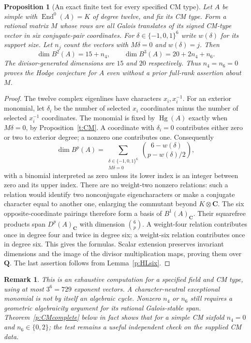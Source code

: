 \documentclass[10pt,reqno]{article}
\theoremstyle{emphasizedplain}
\newtheorem{proposition}[theorem]{Proposition}
\theoremstyle{emphasizeddefinition}
\theoremstyle{emphasizeddefinition}
\newtheorem{remark}[theorem]{Remark}
\DeclareMathOperator{\End}{End}
\DeclareMathOperator{\Hg}{Hg}
\newcommand{\Q}{\mathbf Q}
\newcommand{\C}{\mathbf C}
\begin{document}
\begin{proposition}[An exact finite test for every specified CM type]
\label{p:CMtest}
Let $A$ be simple with $\End^0(A)=K$ of degree twelve, and fix its CM
type. Form a rational matrix $M$ whose rows are all Galois translates
of its signed CM-type vector in six conjugate-pair coordinates. For
$\delta\in\{-1,0,1\}^6$ write $w(\delta)$ for its support size.
Let $n_j$ count the vectors with $M\delta=0$ and $w(\delta)=j$.
Then
\[
 \dim B^2(A)=15+n_4,\qquad
 \dim B^3(A)=20+2n_4+n_6.
\]
The divisor-generated dimensions are $15$ and $20$ respectively.
Thus $n_4=n_6=0$ proves the Hodge conjecture for $A$ even without a
prior full-rank assertion about $M$.
\end{proposition}
\begin{proof}
The twelve complex eigenlines have characters $x_i,x_i^{-1}$.
For an exterior monomial, let $\delta_i$ be the number of selected
$x_i$ coordinates minus the number of selected $x_i^{-1}$ coordinates.
The monomial is fixed by $\Hg(A)$ exactly when $M\delta=0$, by
Proposition~\ref{t:CM}. A coordinate with $\delta_i=0$ contributes
either zero or two to exterior degree; a nonzero one contributes one.
Consequently
\[
 \dim B^p(A)=\sum_{\substack{\delta\in\{-1,0,1\}^6\\M\delta=0}}
 \binom{6-w(\delta)}{p-w(\delta)/2},
\]
with a binomial interpreted as zero unless its lower index is an integer
between zero and its upper index.
There are no weight-two nonzero relations: such a relation would identify
two nonconjugate eigencharacters or make a conjugate character equal to
another one, enlarging the commutant beyond $K\otimes\C$.
The six opposite-coordinate pairings therefore form a basis of
$B^1(A)_\C$. Their squarefree products span $D^p(A)_\C$ with dimension
$\binom6p$. A weight-four relation contributes once in degree four and
twice in degree six; a weight-six relation contributes once in degree six.
This gives the formulas. Scalar extension preserves invariant dimensions
and the image of the divisor multiplication maps, proving them over
$\Q$. The last assertion follows from Lemma~\ref{p:HLsix}.
\end{proof}
\begin{remark}
This is an exhaustive computation for a specified field and CM type,
using at most $3^6=729$ exponent vectors. A character-neutral exceptional
monomial is not by itself an algebraic cycle. Nonzero $n_4$ or $n_6$
still requires a geometric algebraicity argument for its rational
Galois-stable span. Theorem~\ref{p:CMcomplete} below in fact shows
that for a simple CM sixfold $n_4=0$ and $n_6\in\{0,2\}$;
the test remains a useful independent check on the supplied CM data.
\end{remark}
\end{document}
